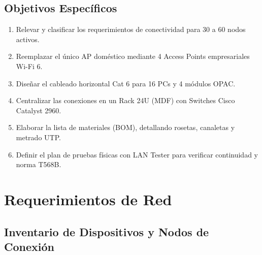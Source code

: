 \documentclass[12pt,a4paper]{article}
\begin{document}
\subsection{Objetivos Específicos}
\begin{enumerate}[leftmargin=1.8em,itemsep=3pt]
  \item Relevar y clasificar los requerimientos de conectividad para 30 a 60 nodos activos.
  \item Reemplazar el único AP doméstico mediante 4 Access Points empresariales Wi-Fi 6.
  \item Diseñar el cableado horizontal Cat 6 para 16 PCs y 4 módulos OPAC.
  \item Centralizar las conexiones en un Rack 24U (MDF) con Switches Cisco Catalyst 2960.
  \item Elaborar la lista de materiales (BOM), detallando rosetas, canaletas y metrado UTP.
  \item Definir el plan de pruebas físicas con LAN Tester para verificar continuidad y norma T568B.
\end{enumerate}

\section{Requerimientos de Red}

\subsection{Inventario de Dispositivos y Nodos de Conexión}
\end{document}
